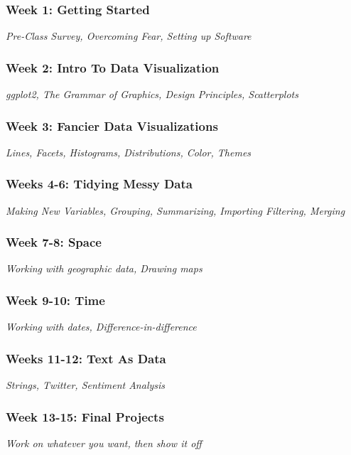 \documentclass[11pt, letterpaper]{article}
\begin{document}
\subsubsection*{Week 1: Getting Started}
\textit{Pre-Class Survey, Overcoming Fear, Setting up Software}

\subsubsection*{Week 2: Intro To Data Visualization}
\textit{ggplot2, The Grammar of Graphics, Design Principles, Scatterplots}

\subsubsection*{Week 3: Fancier Data Visualizations}
\textit{Lines, Facets, Histograms, Distributions, Color, Themes}

\subsubsection*{Weeks 4-6: Tidying Messy Data}
\textit{Making New Variables, Grouping, Summarizing, Importing Filtering, Merging}

\subsubsection*{Week 7-8: Space}
\textit{Working with geographic data, Drawing maps}

\subsubsection*{Week 9-10: Time}
\textit{Working with dates, Difference-in-difference}

\subsubsection*{Weeks 11-12: Text As Data}
\textit{Strings, Twitter, Sentiment Analysis}

\subsubsection*{Week 13-15: Final Projects}
\textit{Work on whatever you want, then show it off}
\end{document}
